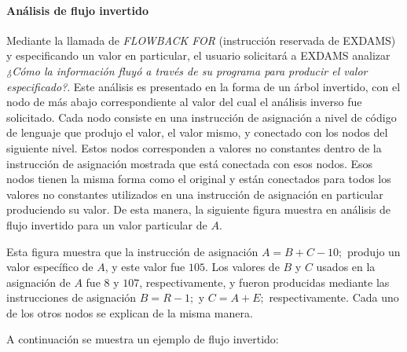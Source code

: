 \documentclass[12pt,legalpaper]{report}
\begin{document}
			\paragraph[Análisis de flujo]{Análisis de flujo invertido}

Mediante la llamada de \textit{FLOWBACK FOR} (instrucción reservada de EXDAMS) y especificando un valor en particular, el usuario solicitará a EXDAMS analizar \textit{¿Cómo la información fluyó a través de su programa para producir el valor especificado?}.  Este análisis es presentado en la forma de un árbol invertido, con el nodo de más abajo correspondiente al valor del cual el análisis inverso fue solicitado.  Cada nodo consiste en una instrucción de asignación a nivel de código de lenguaje que produjo el valor, el valor mismo, y conectado con los nodos del siguiente nivel.  Estos nodos corresponden a valores no constantes dentro de la instrucción de asignación mostrada que está conectada con esos nodos.  Esos nodos tienen la misma forma como el original y están conectados para todos los valores no constantes utilizados en una instrucción de asignación en particular produciendo su valor.  De esta manera, la siguiente figura muestra en análisis de flujo invertido para un valor particular de $A$. 

Esta figura muestra que la instrucción de asignación $A=B+C-10;$ produjo un valor específico de $A$, y este valor fue $105$.  Los valores de $B$ y $C$ usados en la asignación de $A$ fue $8$ y $107$, respectivamente, y fueron producidas mediante las instrucciones de asignación $B=R-1;$ y $C=A+E;$ respectivamente.  Cada uno de los otros nodos se explican de la misma manera.

A continuación se muestra un ejemplo de flujo invertido:
\begin{footnotesize}
\begin{center}
\end{center}
\end{footnotesize}
\end{document}
